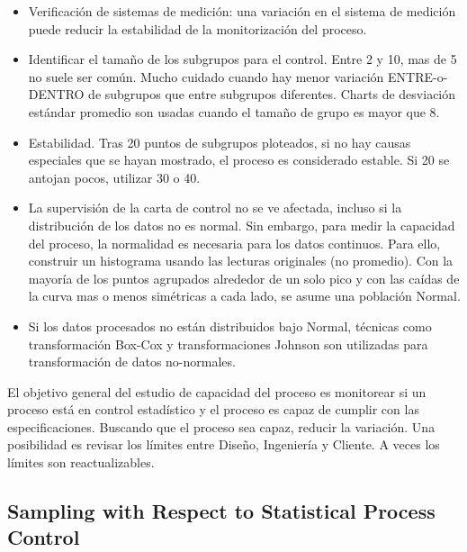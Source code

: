 \documentclass[oneside]{book}
\begin{document}
\begin{itemize}
	\item Verificación de sistemas de medición: una variación en el sistema de medición puede reducir la estabilidad de la monitorización del proceso. 
	\item Identificar el tamaño de los subgrupos para el control. Entre 2 y 10, mas de 5 no suele ser común. Mucho cuidado cuando hay menor variación ENTRE-o-DENTRO de subgrupos que entre subgrupos diferentes. Charts de desviación estándar promedio son usadas cuando el tamaño de grupo es mayor que 8.
	\item Estabilidad. Tras 20 puntos de subgrupos ploteados, si no hay causas especiales que se hayan mostrado, el proceso es considerado estable. Si 20 se antojan pocos, utilizar 30 o 40.
	\item La supervisión de la carta de control no se ve afectada, incluso si la distribución de los datos no es normal. Sin embargo, para medir la capacidad del proceso, la normalidad es necesaria para los datos continuos. \newline Para ello, construir un histograma usando las lecturas originales (no promedio). Con la mayoría de los puntos agrupados alrededor de un solo pico y con las caídas de la curva mas o menos simétricas a cada lado, se asume una población Normal.
	\item Si los datos procesados no están distribuidos bajo Normal, técnicas como transformación Box-Cox y transformaciones Johnson son utilizadas para transformación de datos no-normales.
\end{itemize}

El objetivo general del estudio de capacidad del proceso es monitorear si un proceso está en control estadístico y el proceso es capaz de cumplir con las especificaciones. Buscando que el proceso sea capaz, reducir la variación. Una posibilidad es revisar los límites entre Diseño, Ingeniería y Cliente. A veces los límites son reactualizables.

\subsection{Sampling with Respect to Statistical Process Control}
\end{document}
